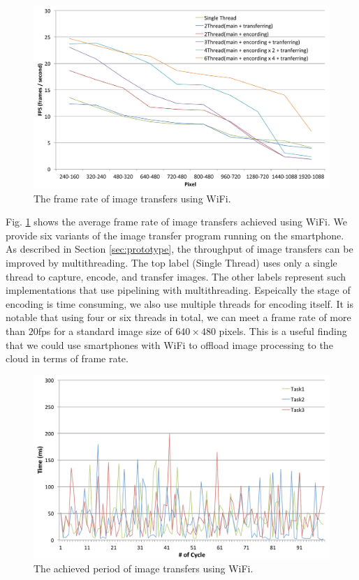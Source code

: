 \begin{figure}[!t]
 \centering
 \includegraphics[width=0.8\hsize]{fig/No8_TIPiC_FPS_graph_WiFi.pdf}
 \caption{The frame rate of image transfers using WiFi.}
 \label{fig:no8}
\end{figure}

Fig. \ref{fig:no8} shows the average frame rate of image transfers
achieved using WiFi.
We provide six variants of the image transfer program running on the
smartphone.
As described in Section \ref{sec:prototype}, the throughput of image
transfers can be improved by multithreading.
The top label (Single Thread) uses only a single thread to capture,
encode, and transfer images.
The other labels represent such implementations that use pipelining with
multithreading.
Espeically the stage of encoding is time consuming, we also use multiple
threads for encoding itself.
It is notable that using four or six threads in total, we can meet a
frame rate of more than $20$fps for a standard image size of $640 \times
480$ pixels.
This is a useful finding that we could use smartphones with WiFi to
offload image processing to the cloud in terms of frame rate.

\begin{figure}[!t]
 \centering
 \includegraphics[width=0.8\hsize]{fig/No9_TIPiC_serv_cycle_WiFi.pdf}
 \caption{The achieved period of image transfers using WiFi.}
 \label{fig:no9}
\end{figure}

